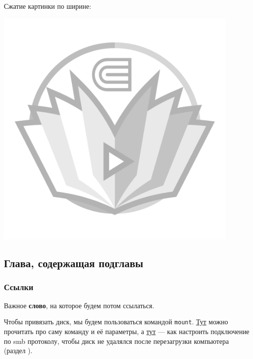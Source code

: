 Сжатие картинки по ширине:
\begin{center}
  \begin{minipage}[c]{0.9\textwidth}
    \centering
    \includegraphics[width=0.9\textwidth,fbox]{Images/watermark.png}
  \end{minipage}
\end{center}

\subsection{Глава, содержащая подглавы}

\subsubsection{Ссылки}

Важное \noindent\hypertarget{link-to-word}{\textbf{слово}}, на которое будем потом ссылаться.

Чтобы привязать диск, мы будем пользоваться командой \texttt{mount}. \href{https://losst.pro/montirovanie-diska-v-linux}{Тут} можно прочитать про саму команду и её параметры, а \href{https://ubuntuforums.org/showthread.php?t=288534}{тут} --- как настроить подключение по smb протоколу, чтобы диск не удалялся после перезагрузки компьютера (раздел ).

